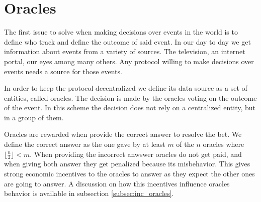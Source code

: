 \section{Oracles}

The first issue to solve when making decisions over events in the world is to
  define who track and define the outcome of said event.
In our day to day we get information about events from a variety of sources. The
  television, an internet portal, our eyes among many others. Any protocol
  willing to make decisions over events needs a source for those events.

In order to keep the protocol decentralized we define its data source as a set
  of entities, called oracles. The decision is made by the oracles voting on
  the outcome of the event. In this scheme the decision does not rely on a
  centralized entity, but in a group of them.

Oracles are rewarded when provide the correct answer to resolve the bet.
We define the correct answer as the one gave by at least $m$ of the $n$ oracles
  where $\lfloor \frac{n}{2} \rfloor < m$.
When providing the incorrect anwswer oracles do not get paid, and when giving
  both answer they get penalized because its misbehavior. This gives strong
  economic incentives to the oracles to answer as they expect the other ones
  are going to answer.
A discussion on how this incentives influence oracles behavior is available
  in subsection \ref{subsec:inc_oracles}.
